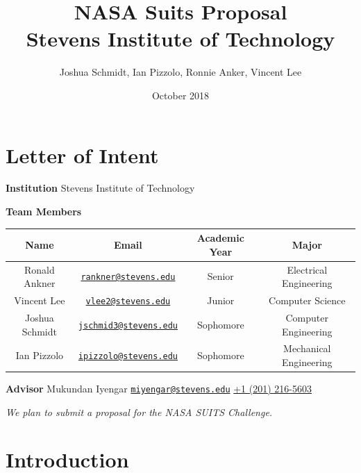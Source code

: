 \documentclass{article}
\title{%
	NASA Suits Proposal \\
	\large Stevens Institute of Technology}
\date{October 2018}
\author{Joshua Schmidt, Ian Pizzolo, Ronnie Anker, Vincent Lee}
\let\Oldsection\section
\renewcommand{\section}{\FloatBarrier\Oldsection}
\begin{document}
\maketitle

\newpage

\tableofcontents

\newpage

\section{Letter of Intent}

\begin{center}

\bigskip
\bigskip
\textbf{Institution}
Stevens Institute of Technology
\bigskip

\textbf{Team Members}
\bigskip
\bigskip
\begin{tabular}{||c c c c||} 
 \hline
 Name & Email & Academic Year & Major \\ [0.5ex] 
 \hline\hline
 Ronald Ankner & \href{mailto:rankner@stevens.edu}{\nolinkurl{rankner@stevens.edu}} & Senior & Electrical Engineering \\ 
 \hline
 Vincent Lee & \href{mailto:vlee2@stevens.edu}{\nolinkurl{vlee2@stevens.edu}} & Junior & Computer Science \\
 \hline
 Joshua Schmidt & \href{mailto:jschmid3@stevens.edu}{\nolinkurl{jschmid3@stevens.edu}} & Sophomore & Computer Engineering \\
 \hline
 Ian Pizzolo & \href{mailto:ipizzolo@stevens.edu}{\nolinkurl{ipizzolo@stevens.edu}} & Sophomore & Mechanical Engineering \\
 \hline
\end{tabular}

\bigskip
\bigskip

\textbf{Advisor}
\bigskip
Mukundan Iyengar\newline
\href{mailto:miyengar@stevens.edu}{\nolinkurl{miyengar@stevens.edu}}\newline
\href{tel:12012165603}{+1 (201) 216-5603}

\bigskip
\bigskip
\textit{We plan to submit a proposal for the NASA SUITS Challenge.}

\end{center}

\newpage

\section{Introduction}
\end{document}
